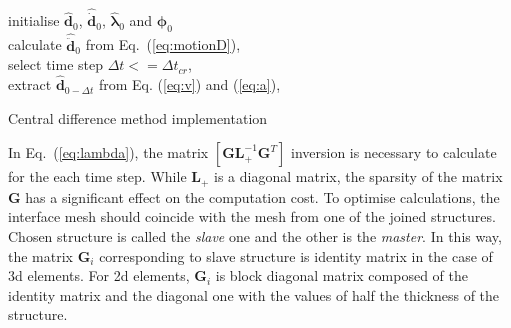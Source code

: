 \begin{algorithm}[H]
	\SetAlgoLined
	initialise  \(\widehat{\textbf{d}}_0\), \(\widehat{\dot{\textbf{d}}}_0\), \(\widehat{\boldsymbol{\lambda}}_0\) and \(\boldsymbol{\phi}_{0}\)\\
	calculate \(\widehat{\ddot{\textbf{d}}}_0\) from Eq.~(\ref{eq:motionD}),\\
	select time step \(\Delta t<=\Delta t_{cr}\),\\
	extract \(\widehat{\textbf{d}}_{0-\Delta t}\) from Eq. (\ref{eq:v}) and (\ref{eq:a}),\\
	\caption{Central difference method implementation}
	\label{alg:cdm}
\end{algorithm}

In Eq.~(\ref{eq:lambda}), the matrix \(\left [\textbf{GL}_+^{-1}\textbf{G}^T\right ]\) inversion is necessary to calculate for the each time step.
While \(\textbf{L}_+\) is a diagonal matrix, the sparsity of the matrix \(\textbf{G}\) has a significant effect on the computation cost.
To optimise calculations, the interface mesh should coincide with the mesh from one of the joined structures.
Chosen structure is called the \textit{slave} one and the other is the \textit{master}.
In this way, the matrix \(\mathbf{G}_i\) corresponding to slave structure is identity matrix in the case of \ac{3d} elements.
For \ac{2d} elements, \(\mathbf{G}_i\) is block diagonal matrix composed of the identity matrix and the diagonal one with the values of half the thickness of the structure.
